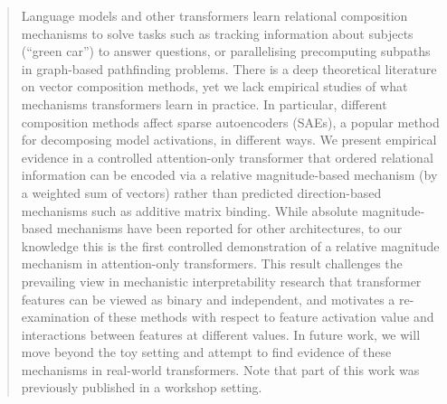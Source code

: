 \begin{abstract}
Language models and other transformers learn relational composition mechanisms to solve tasks such as tracking information about subjects (``green car'') to answer questions, or parallelising precomputing subpaths in graph-based pathfinding problems. There is a deep theoretical literature on vector composition methods, yet we lack empirical studies of what mechanisms transformers learn in practice. In particular, different composition methods affect sparse autoencoders (SAEs), a popular method for decomposing model activations, in different ways.
We present empirical evidence in a controlled attention-only transformer that ordered relational information can be encoded via a relative magnitude-based mechanism (by a weighted sum of vectors) rather than predicted direction-based mechanisms such as additive matrix binding. While absolute magnitude-based mechanisms have been reported for other architectures, to our knowledge this is the first controlled demonstration of a relative magnitude mechanism in attention-only transformers.
This result challenges the prevailing view in mechanistic interpretability research that transformer features can be viewed as binary and independent, and motivates a re-examination of these methods with respect to feature activation value and interactions between features at different values.
In future work, we will move beyond the toy setting and attempt to find evidence of these mechanisms in real-world transformers.
Note that part of this work was previously published in a workshop setting.
\end{abstract}